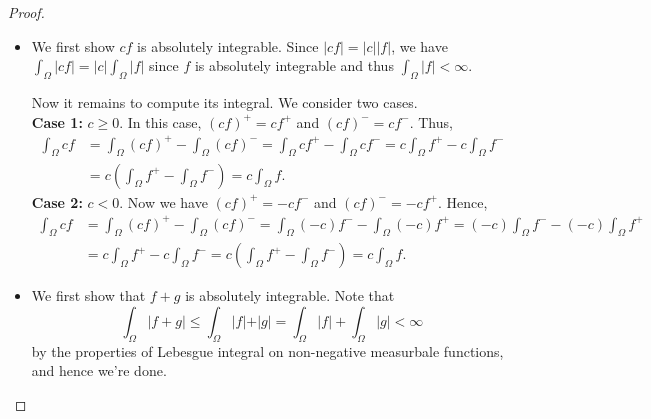 \begin{proof}
    \hfill 
    \begin{itemize}
        \item [(a)] We first show \(cf\) is absolutely integrable. Since \(\vert cf \vert = \vert c \vert \vert f \vert   \), we have \(\int _\Omega \vert cf \vert = \vert c \vert  \int _\Omega \vert f \vert  \) since \(f\) is absolutely integrable and thus \(\int _\Omega \vert f \vert < \infty \). 
        
        Now it remains to compute its integral. We consider two cases. \\
        \textbf{Case 1:} \(c \ge 0\). In this case, \((cf)^+ = c f^+\) and \((cf)^- = c f^-\). Thus, 
        \begin{align*}
            \int _\Omega cf &= \int _\Omega (cf)^+ - \int _\Omega (cf)^- = \int _\Omega cf^+ - \int _\Omega cf^- = c \int _\Omega f^+ - c \int _\Omega f^- \\
            &= c \left( \int _\Omega f^+ - \int _\Omega f^- \right) = c \int _\Omega f. 
        \end{align*}    
        \textbf{Case 2:} \(c < 0\). Now we have \((cf)^+ = -c f^-\) and \((cf)^- = -c f^+\). Hence,
        \begin{align*}
            \int _\Omega cf &= \int _\Omega (cf)^+ - \int _\Omega (cf)^- = \int _\Omega (-c) f^- - \int _\Omega (-c) f^+ = (-c) \int _\Omega f^- - (-c) \int_\Omega f^+ \\
            &= c \int _\Omega f^+ - c \int _\Omega f^- = c \left( \int _\Omega f^+ - \int _\Omega f^- \right) = c \int _\Omega f. 
        \end{align*}    
        \item [(b)] We first show that \(f + g\) is absolutely integrable. Note that 
        \[
            \int _\Omega \vert f + g \vert \le \int _\Omega \vert f \vert + \vert g \vert = \int _\Omega \vert f \vert + \int _\Omega \vert g \vert < \infty    
        \]
        by the properties of Lebesgue integral on non-negative measurbale functions, and hence we're done. 


\end{itemize}
\end{proof}
